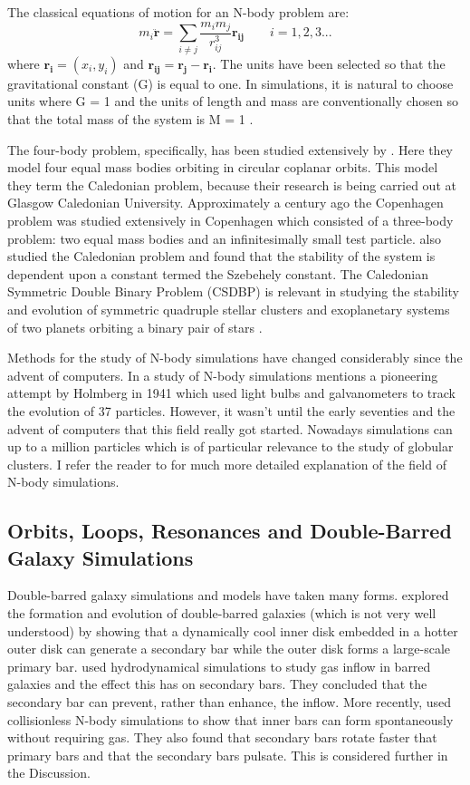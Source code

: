 \documentclass[a4paper,12pt]{article}
\begin{document}
The classical equations of motion for an N-body problem are:
\begin{equation}
m_i\mathbf{\ddot{r}}=\sum_{i\neq{j}}\frac{{m_i}{m_j}}{r^3_{ij}}\mathbf{r_{ij}}
\qquad
i=1,2,3...
\end{equation}
where $\mathbf{r_i}=\left(x_i,y_i\right)$ and $\mathbf{r_{ij}}=\mathbf{r_j}-\mathbf{r_i}$. 
The units have been selected so that the gravitational constant (G) is equal to one. In simulations, it is natural to choose units where G = 1 and the units of length and mass are conventionally chosen
so that the total mass of the system is M = 1 \citep{heggie}.

The four-body problem, specifically, has been studied extensively by \cite{steves}. Here they model four equal mass bodies orbiting in circular coplanar orbits. This model they term the Caledonian problem, because
their research is being carried out at Glasgow Caledonian University.
Approximately a century ago the Copenhagen problem was studied extensively in Copenhagen which consisted of a three-body problem: two equal mass bodies and an infinitesimally small test particle. \cite{szell} also
studied the Caledonian problem and found that the stability of the system is dependent upon a constant termed the Szebehely constant. The Caledonian Symmetric Double Binary Problem (CSDBP) is relevant in 
studying the stability and evolution of symmetric quadruple stellar clusters and exoplanetary systems of two planets orbiting a binary pair of stars \citep{alvarez}.

Methods for the study of N-body simulations have changed considerably since the advent of computers. In a study of N-body simulations \cite{trenti} mentions a pioneering attempt by Holmberg in 1941 which used 
light bulbs and galvanometers to track the evolution of 37 particles. However, it wasn't until the early seventies and the advent of computers that this field really got started. 
Nowadays simulations can up to a million particles \citep{heggie} which is of particular relevance to the study of globular
clusters. I refer the reader to \cite{aarseth} for much more detailed explanation of the field of N-body simulations.

\subsection{Orbits, Loops, Resonances and Double-Barred Galaxy Simulations}
Double-barred galaxy simulations and models have taken many forms. \cite{du1} explored the formation and evolution of double-barred galaxies (which is not very well understood) by showing that a dynamically
cool inner disk embedded in a hotter outer disk can generate a secondary bar while the outer disk forms a large-scale primary bar. \cite{macie8} used hydrodynamical simulations to study gas inflow in barred galaxies
and the effect this has on secondary bars. They concluded that the secondary bar can prevent, rather than enhance, the inflow. More recently, \cite{debattista} used collisionless N-body simulations to show
that inner bars can form spontaneously without requiring gas. They also found that secondary bars rotate faster that primary bars and that the secondary bars pulsate. This is considered further in the Discussion.
\end{document}
